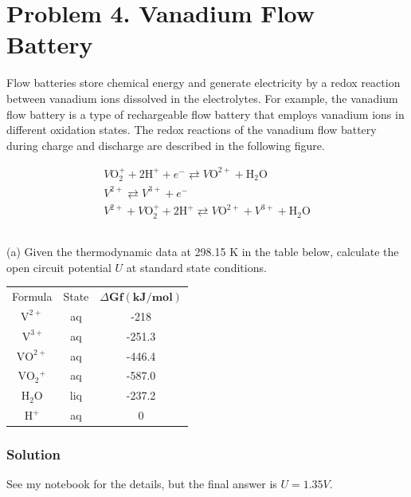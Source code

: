 \documentclass[12pt]{article}
\begin{document}
\section{Problem 4. Vanadium Flow Battery}
Flow batteries store chemical energy and generate electricity by a redox reaction between vanadium ions dissolved in the electrolytes. For example, the vanadium flow battery is a type of rechargeable flow battery that employs vanadium ions in different oxidation states. The redox reactions of the vanadium flow battery during charge and discharge are described in the following figure.

$$
\begin{gathered}
V \mathrm{O}_{2}^{+}+2 \mathrm{H}^{+}+e^{-} \rightleftarrows V \mathrm{O}^{2+}+\mathrm{H}_{2} \mathrm{O} \\
V^{2+} \rightleftarrows V^{3+}+e^{-} \\
\hline V^{2+}+V \mathrm{O}_{2}^{+}+2 \mathrm{H}^{+} \rightleftarrows V \mathrm{O}^{2+}+V^{3+}+\mathrm{H}_{2} \mathrm{O}
\end{gathered}
$$
\subsection{}
(a) Given the thermodynamic data at 298.15 K in the table below, calculate the open circuit potential $U$ at standard state conditions.

\begin{center}
\begin{tabular}{ccc}
Formula & State & $\Delta \mathbf{G} \mathbf{f}(\mathbf{k J} / \mathbf{m o l})$ \\
$\mathrm{V}^{2+}$ & aq & -218 \\
$\mathrm{~V}^{3+}$ & aq & -251.3 \\
$\mathrm{VO}^{2+}$ & aq & -446.4 \\
$\mathrm{VO}_{2}{ }^{+}$ & aq & -587.0 \\
$\mathrm{H}_{2} \mathrm{O}$ & liq & -237.2 \\
$\mathrm{H}^{+}$ & aq & 0 \\
\end{tabular}
\end{center}
\subsubsection{Solution}
See my notebook for the details, but the final answer is $U = 1.35 V$.
\end{document}

